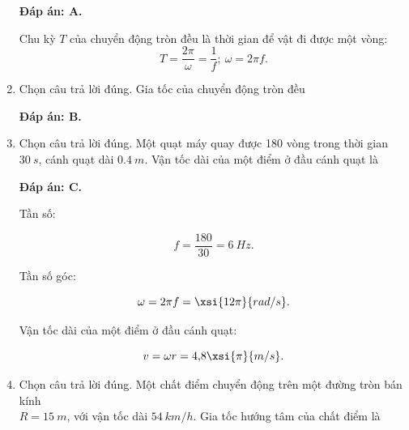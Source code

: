 \begin{enumerate}[label=\bfseries Câu \arabic*:]
	\hideall
	{	
		\textbf{Đáp án: A.}
		
		Chu kỳ $T$ của chuyển động tròn đều là thời gian để vật đi được một vòng: 
		$$T = \dfrac{2\pi}{\omega} = \dfrac{1}{f};\ \omega = 2\pi f.$$
		
	}
	\item {}
	
	
	{Chọn câu trả lời đúng. Gia tốc của chuyển động tròn đều 
	}
	
	\hideall
	{	
		\textbf{Đáp án: B.}
	}
	\item {}
	
	
	{Chọn câu trả lời đúng. Một quạt máy quay được 180 vòng trong thời gian $\SI{30}{s}$, cánh quạt dài $\SI{0,4}{m}$. Vận tốc dài của một điểm ở đầu cánh quạt là 
	}
	
	\hideall
	{	
		\textbf{Đáp án: C.}
		
		Tần số:
		
		$$f = \dfrac{180}{30} = \SI{6}{Hz}.$$
		
		Tần số góc:
		
		$$\omega = 2\pi f = \xsi{12\pi}{rad/s}.$$
		
		Vận tốc dài của một điểm ở đầu cánh quạt:
		
		$$v = \omega r = \text{4,8}\xsi{\pi}{m/s}.$$
	}
	\item {}
	
	
	{ Chọn câu trả lời đúng. Một chất điểm chuyển động trên một đường tròn bán kính \\$R = \SI{15}{m}$, với vận tốc dài $\SI{54}{km/h}$. Gia tốc hướng tâm của chất điểm là 
	}
	

\end{enumerate}
